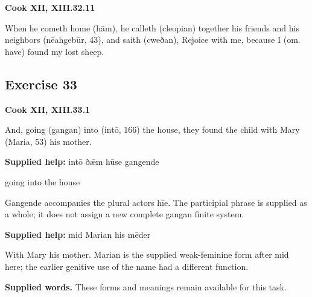 \par\begin{minipage}{\linewidth}\raggedright
\textbf{Cook XII, XIII.32.11}

When he cometh home (hām), he calleth (cleopian) together his friends and his neighbors (nēahgebūr, 43), and saith (cweðan), Rejoice with me, because I (om. have) found my lost sheep.

\end{minipage}\par\addvspace{4pt}

\subsection*{Exercise 33}

\par\begin{minipage}{\linewidth}\raggedright
\textbf{Cook XII, XIII.33.1}

And, going (gangan) into (intō, 166) the house, they found the child with Mary (Maria, 53) his mother.

\textbf{Supplied help:} intō ðǣm hūse gangende

going into the house

Gangende accompanies the plural actors hīe. The participial phrase is supplied as a whole; it does not assign a new complete gangan finite system.

\textbf{Supplied help:} mid Marian his mēder

With Mary his mother. Marian is the supplied weak-feminine form after mid here; the earlier genitive use of the name had a different function.

\end{minipage}\par\addvspace{4pt}

\textbf{Supplied words.} These forms and meanings remain available for this task.

